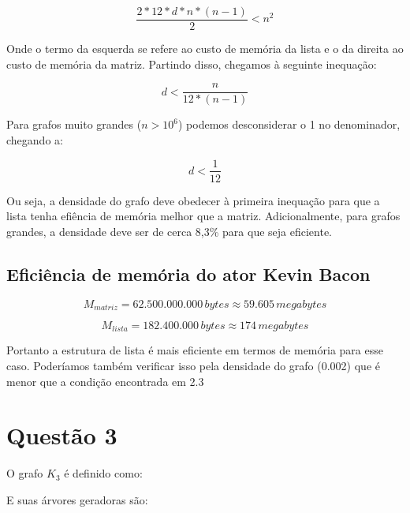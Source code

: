 \documentclass{article}
\begin{document}
\[{\frac{2*12*d*n*(n-1)}{2}} < n^2\]

Onde o termo da esquerda se refere ao custo de memória da lista e o da direita ao custo de memória da matriz. Partindo disso, chegamos à seguinte inequação:

\[d < \frac{n}{12*(n-1)}\]

Para grafos muito grandes (${n > 10^6}$) podemos desconsiderar o 1 no denominador, chegando a:

\[d < \frac{1}{12}\]

Ou seja, a densidade do grafo deve obedecer à primeira inequação para que a lista tenha efiência de memória melhor que a matriz. Adicionalmente, para grafos grandes, a densidade deve ser de cerca 8,3\% para que seja eficiente.

\subsection{Eficiência de memória do ator Kevin Bacon}

\[M_{matriz} = 62.500.000.000 \, bytes \approx 59.605 \, megabytes\]

\[M_{lista} = 182.400.000 \, bytes \approx 174 \, megabytes\]

Portanto a estrutura de lista é mais eficiente em termos de memória para esse caso. Poderíamos também verificar isso pela densidade do grafo (0.002) que é menor que a condição encontrada em 2.3

\newpage
\section{Questão 3}

O grafo ${K_3}$ é definido como:


E suas árvores geradoras são:
\end{document}
